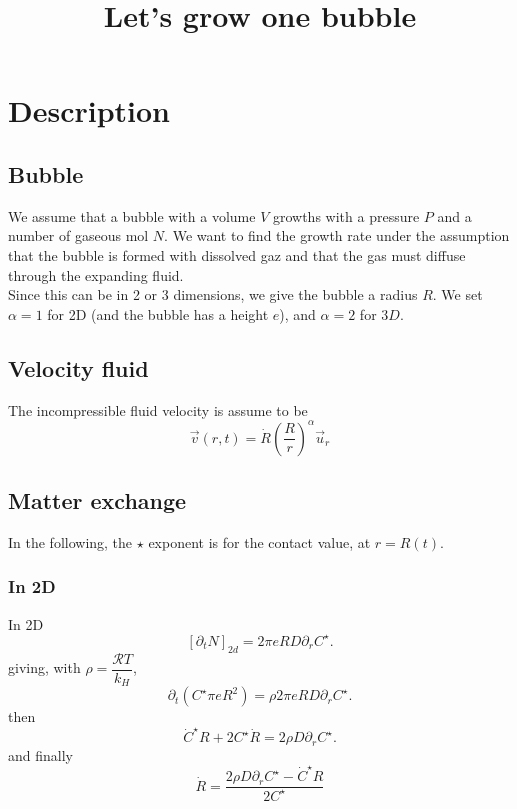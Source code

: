 \documentclass[11pt]{revtex4}
\begin{document}
\title{Let's grow one bubble}

\maketitle

\section{Description}
\subsection{Bubble}
We assume that a bubble with a volume $V$ growths with a pressure $P$ and a number of
gaseous mol $N$.
We want to find the growth rate under the assumption that the bubble is formed with dissolved gaz
and that the gas must diffuse through the expanding fluid.\\
Since this can be in 2 or 3 dimensions, we give the bubble a radius $R$.
We set $\alpha=1$ for 2D (and the bubble has a height $e$), and $\alpha=2$ for $3D$.

\subsection{Velocity fluid}
The incompressible fluid velocity is assume to be
\begin{equation}
	\vec{v}(r,t) = \dot{R} \left(\dfrac{R}{r}\right)^\alpha \vec{u}_r
\end{equation}

\subsection{Matter exchange}
In the following, the $\star$ exponent is for the contact value, at $r=R(t)$.\\

\subsubsection{In 2D}
In 2D
\begin{equation}
	\left[\partial_t N\right]_{2d} = 2\pi e R  D \partial_r C^\star.
\end{equation}
giving,  with $\rho=\dfrac{\mathcal{R}T}{k_H}$,
\begin{equation}
	\partial_t\left( C^\star \pi e R^2\right) = \rho 2\pi e R  D \partial_r C^\star.
\end{equation}
then
\begin{equation}
	\dot{C}^\star R + 2 C^\star \dot{R}  = 2\rho  D \partial_r C^\star.
\end{equation}
and finally
\begin{equation}
	\dot{R} = \dfrac{ 2\rho  D \partial_r C^\star - \dot{C}^\star R }{2C^\star}
\end{equation}
\end{document}
